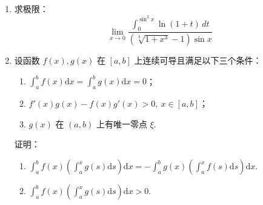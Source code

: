 \documentclass[11pt, a4paper]{article}
\begin{document}
\begin{enumerate}
    \item[11.] 求极限：
    \[\lim\limits_{x \to 0} \dfrac{\int_{0}^{\sin^{2}x} \ln(1 + t) \, dt}{\left( \sqrt[3]{1 + x^{3}} - 1 \right) \sin x} \]

    \vspace{2em}
    
    \item[12.] 设函数 $f(x),g(x)$ 在 $[a,b]$ 上连续可导且满足以下三个条件：
    \begin{enumerate}
        \item[(i)] $\displaystyle \int_{a}^{b} f(x) \mathrm{d}x = \int_{a}^{b} g(x) \mathrm{d}x = 0$；
        \item[(ii)] $f'(x)g(x) - f(x)g'(x) > 0,\ x \in [a,b]$；
        \item[(iii)] $g(x)$ 在 $(a,b)$ 上有唯一零点 $\xi$.
    \end{enumerate}
    证明：
    \begin{enumerate}
        \item[(1)] $\displaystyle \int_{a}^{b} f(x) \left( \int_{a}^{x} g(s) \mathrm{d}s \right) \mathrm{d}x = - \int_{a}^{b} g(x) \left( \int_{a}^{x} f(s) \mathrm{d}s \right) \mathrm{d}x$.
        \item[(2)] $\displaystyle \int_{a}^{b} f(x) \left( \int_{a}^{x} g(s) \mathrm{d}s \right) \mathrm{d}x > 0$.
    \end{enumerate}
    \end{enumerate}
\end{document}
